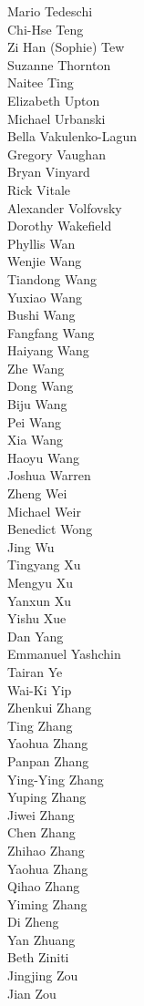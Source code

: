 Mario  Tedeschi\\
Chi-Hse Teng\\
Zi Han (Sophie) Tew\\
Suzanne Thornton\\
Naitee Ting\\
Elizabeth Upton\\
Michael Urbanski\\
Bella Vakulenko-Lagun\\
Gregory Vaughan\\
Bryan Vinyard\\
Rick Vitale\\
Alexander Volfovsky\\
Dorothy Wakefield\\
Phyllis Wan\\
Wenjie Wang\\
Tiandong Wang\\
Yuxiao Wang\\
Bushi Wang\\
Fangfang Wang\\
Haiyang Wang\\
Zhe Wang\\
Dong Wang\\
Biju Wang\\
Pei Wang\\
Xia Wang\\
Haoyu Wang\\
Joshua Warren\\
Zheng Wei\\
Michael Weir\\
Benedict Wong\\
Jing Wu\\
Tingyang Xu\\
Mengyu Xu\\
Yanxun Xu\\
Yishu Xue\\
Dan Yang\\
Emmanuel Yashchin\\
Tairan Ye\\
Wai-Ki Yip\\
Zhenkui Zhang\\
Ting Zhang\\
Yaohua  Zhang\\
Panpan Zhang\\
Ying-Ying Zhang\\
Yuping Zhang\\
Jiwei Zhang\\
Chen Zhang\\
Zhihao Zhang\\
Yaohua Zhang\\
Qihao Zhang\\
Yiming Zhang\\
Di Zheng\\
Yan Zhuang\\
Beth Ziniti\\
Jingjing Zou\\
Jian Zou\\
